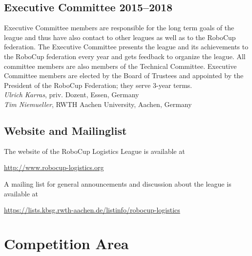 \documentclass[12pt,twoside]{article}
\begin{document}
\subsection{Executive Committee 2015--2018}
\label{sec:oc}
Executive Committee members are responsible for the long term goals of
the league and thus have also contact to other leagues as well as to
the RoboCup federation. The Executive Committee presents the league
and its achievements to the RoboCup federation every year and gets
feedback to organize the league. All committee members are also
members of the Technical Committee. Executive Committee members are
elected by the Board of Trustees and appointed by the President of the
RoboCup Federation; they serve 3-year terms.\\[.5em]
\emph{Ulrich Karras}, priv. Dozent, Essen, Germany\\
\emph{Tim Niemueller}, RWTH Aachen University, Aachen, Germany

\subsection{Website and Mailinglist}
\label{sec:website-ml}
The website of the RoboCup Logistics League is available at\\
\centerline{\url{http://www.robocup-logistics.org}}

\smallskip
\noindent
A mailing list for general announcements and discussion about the
league is available at\\
\centerline{\url{https://lists.kbsg.rwth-aachen.de/listinfo/robocup-logistics}}


\section{Competition Area} \label{sec:area}
\end{document}
